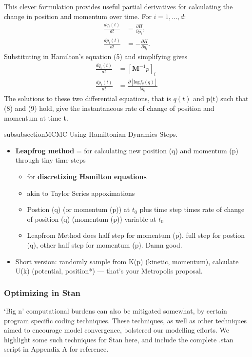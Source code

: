 \documentclass{article}
\begin{document}
This clever formulation provides useful partial derivatives for calculating the change in position and momentum over time. For $i = 1,\dots, d$:
\begin{align}
\frac{d q_{i}(t)}{dt} &= \frac{\partial H}{\partial p_{i}}, \\
\frac{d p_{i}(t)}{dt} &= -\frac{\partial H}{\partial q_{i}}.
\end{align}
Substituting in Hamilton's equation (5) and simplifying gives
\begin{align}
\frac{d q_{i}(t)}{dt} &=  [\pmb{M}^{-1}p]_{i} \\
\frac{d p_{i}(t)}{dt} &= \frac {\partial \left[ \text{log}f_{q}(q) \right]}{\partial q_{i}}
\end{align}
The solutions to these two differential equations, that is $q(t)$ and p(t) such that (8) and (9) hold, give the instantaneous rate of change of position and momentum at time t. 

subsubsection{MCMC Using Hamiltonian Dynamics \citep{Neal2011}} %
Steps.

\begin{itemize}

\item {\bf Leapfrog method} = for calculating new position (q) and momentum (p) through tiny time steps
  \begin{itemize}
  \item for {\bf discretizing Hamilton equations}
  \item akin to Taylor Series appoximations
  \item Postion (q) (or momentum (p)) at $t_{0}$ plus time step times rate of change of position (q) (momentum (p)) variable at $t_{0}$
  \item Leapfrom Method does half step for momentum (p), full step for postion (q), other half step for momentum (p). Damn good.

  \end{itemize}

\item Short version: randomly sample from K(p) (kinetic, momentum), calculate U(k) (potential, position*) --- that's your Metropolis proposal.
\end{itemize}


\subsubsection{Optimizing in Stan} %
`Big n' computational burdens can also be mitigated somewhat, by certain program specific coding techniques. These techniques, as well as other techniques aimed to encourage model convergence, bolstered our modelling efforts. We highlight some such techniques for Stan here, and include the complete .stan script in Appendix A for reference. 
\end{document}
